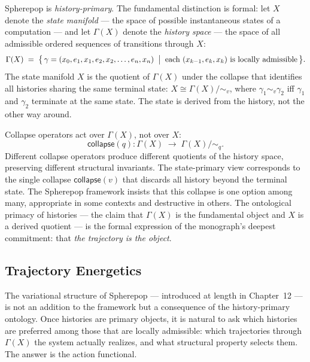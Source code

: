 \documentclass[12pt,openany]{book}
\theoremstyle{plain}
\theoremstyle{definition}
\theoremstyle{remark}
\newcommand{\scollapse}[1]{\mathsf{collapse}\!\left(#1\right)}
\begin{document}
Spherepop is \emph{history-primary}. The fundamental distinction is formal: let $X$ denote the \emph{state manifold} — the space of possible instantaneous states of a computation — and let $\Gamma(X)$ denote the \emph{history space} — the space of all admissible ordered sequences of transitions through $X$:
\[
  \Gamma(X) \;=\; \bigl\{\, \gamma = (x_0, e_1, x_1, e_2, x_2, \ldots, e_n, x_n) \;\bigm|\; \text{each } (x_{k-1}, e_k, x_k) \text{ is locally admissible} \,\bigr\}.
\]
The state manifold $X$ is the quotient of $\Gamma(X)$ under the collapse that identifies all histories sharing the same terminal state: $X \cong \Gamma(X)/{\sim_v}$, where $\gamma_1 \sim_v \gamma_2$ iff $\gamma_1$ and $\gamma_2$ terminate at the same state. The state is derived from the history, not the other way around.

Collapse operators act over $\Gamma(X)$, not over $X$:
\[
  \scollapse{q} : \Gamma(X) \;\longrightarrow\; \Gamma(X)/{\sim_q}.
\]
Different collapse operators produce different quotients of the history space, preserving different structural invariants. The state-primary view corresponds to the single collapse $\scollapse{v}$ that discards all history beyond the terminal state. The Spherepop framework insists that this collapse is one option among many, appropriate in some contexts and destructive in others. The ontological primacy of histories — the claim that $\Gamma(X)$ is the fundamental object and $X$ is a derived quotient — is the formal expression of the monograph's deepest commitment: that \emph{the trajectory is the object}.

\subsection*{Trajectory Energetics}

The variational structure of Spherepop — introduced at length in Chapter~12 — is not an addition to the framework but a consequence of the history-primary ontology. Once histories are primary objects, it is natural to ask which histories are preferred among those that are locally admissible: which trajectories through $\Gamma(X)$ the system actually realizes, and what structural property selects them. The answer is the action functional.
\end{document}
